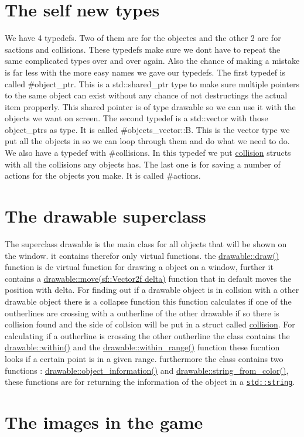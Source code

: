 \hypertarget{index_typedefs}{}\section{The self new types}\label{index_typedefs}
We have 4 typedefs. Two of them are for the objectes and the other 2 are for sactions and collisions. These typedefs make sure we dont have to repeat the same complicated types over and over again. Also the chance of making a mistake is far less with the more easy names we gave our typedefs. The first typedef is called \#object\+\_\+ptr. This is a std\+::shared\+\_\+ptr type to make sure multiple pointers to the same object can exist without any chance of not destructings the actual item propperly. This shared pointer is of type drawable so we can use it with the objects we want on screen. The second typedef is a std\+::vector with those object\+\_\+ptrs as type. It is called \#objects\+\_\+vector\+::B. This is the vector type we put all the objects in so we can loop through them and do what we need to do. We also have a typedef with \#collisions. In this typedef we put \hyperlink{structcollision}{collision} structs with all the collisions any objects has. The last one is for saving a number of actions for the objects you make. It is called \#actions.\hypertarget{index_drawable}{}\section{The drawable superclass}\label{index_drawable}
The superclass drawable is the main class for all objects that will be shown on the window. it contains therefor only virtual functions. the \hyperlink{classdrawable_a4e49e2c1121704c83ce24c5f48dd910f}{drawable\+::draw()} function is de virtual function for drawing a object on a window, further it contains a \hyperlink{classdrawable_ad0d3930c045cc6776aa2c3965be32491}{drawable\+::move(sf\+::\+Vector2f delta)} function that in default moves the position with delta. For finding out if a drawable object is in collsion with a other drawable object there is a collapse function this function calculates if one of the outherlines are crossing with a outherline of the other drawable if so there is collision found and the side of collsion will be put in a struct called \hyperlink{structcollision}{collision}. For calculating if a outherline is crossing the other outherline the class contains the \hyperlink{classdrawable_a0d3278e4e888fc8289468e8893dd8329}{drawable\+::within()} and the \hyperlink{classdrawable_ab5c0e1af885f214bc9ef0da47cdb5ac9}{drawable\+::within\+\_\+range()} function these fucntion looks if a certain point is in a given range. furthermore the class contains two functions \+: \hyperlink{classdrawable_a2ed0f8bb53f33477f7722efa7bb24583}{drawable\+::object\+\_\+information()} and \hyperlink{classdrawable_add3d8569fe2616ae0ed503b19c92c08e}{drawable\+::string\+\_\+from\+\_\+color()}, these functions are for returning the information of the object in a \href{http://www.cplusplus.com/reference/string/string/string/}{\tt std\+::string}.\hypertarget{index_images}{}\section{The images in the game}\label{index_images}
